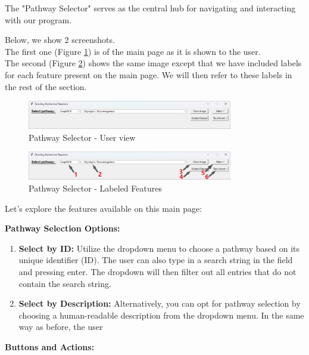 The "Pathway Selector" serves as the central hub for navigating and interacting with our program.

Below, we show 2 screenshots. \\
The first one (Figure \ref{fig:pathway_selector}) is of the main page as it is shown to the user. \\
The second (Figure \ref{fig:pathway_selector_labeled_features}) shows the same image except that we have included labels for each feature present on the main page. We will then refer to these labels in the rest of the section.

\begin{figure}[H]
    \centering
    \includegraphics[width=0.8\textwidth]{Design of the User Interface/selector.png}
    \caption{Pathway Selector - User view}
    \label{fig:pathway_selector}
\end{figure}

\begin{figure}[H]
    \centering
    \includegraphics[width=0.8\textwidth]{Design of the User Interface/selector labeled.png}
    \caption{Pathway Selector - Labeled Features}
    \label{fig:pathway_selector_labeled_features}
\end{figure}
Let's explore the features available on this main page:

\textbf{Pathway Selection Options:}

\begin{enumerate}
    \item \textbf{Select by ID:} Utilize the dropdown menu to choose a pathway based on its unique identifier (ID). The user can also type in a search string in the field and pressing enter. The dropdown will then filter out all entries that do not contain the search string.
    \item \textbf{Select by Description:} Alternatively, you can opt for pathway selection by choosing a human-readable description from the dropdown menu. In the same way as before, the user 
\end{enumerate}


\textbf{Buttons and Actions:}

